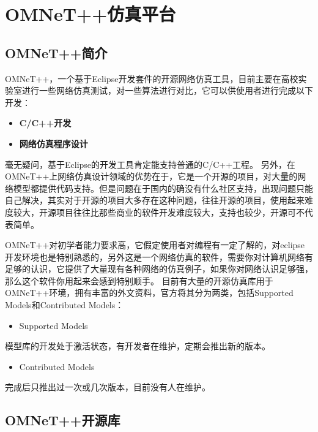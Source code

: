 \chapter{OMNeT++仿真平台}
\label{omnet仿真平台}

\section{OMNeT++简介}
\label{omnet简介}

OMNeT++，一个基于Eclipse开发套件的开源网络仿真工具，目前主要在高校实验室进行一些网络仿真测试，对一些算法进行对比，它可以供使用者进行完成以下开发：

\begin{itemize}
\item \textbf{C\slash C++开发}

\item \textbf{网络仿真程序设计}

\end{itemize}

毫无疑问，基于Eclipse的开发工具肯定能支持普通的C\slash C++工程。
另外，在OMNeT++上网络仿真设计领域的优势在于，它是一个开源的项目，对大量的网络模型都提供代码支持。但是问题在于国内的确没有什么社区支持，出现问题只能自己解决，其实对于开源的项目大多存在这种问题，往往开源的项目，使用起来难度较大，开源项目往往比那些商业的软件开发难度较大，支持也较少，开源可不代表简单。

OMNeT++对初学者能力要求高，它假定使用者对编程有一定了解的，对eclipse开发环境也是特别熟悉的，另外这是一个网络仿真的软件，需要你对计算机网络有足够的认识，它提供了大量现有各种网络的仿真例子，如果你对网络认识足够强，那么这个软件你用起来会感到特别顺手。
目前有大量的开源仿真库用于OMNeT++环境，拥有丰富的外文资料，官方将其分为两类，包括Supported Models和Contributed Models：

\begin{itemize}
\item Supported Models

\end{itemize}

模型库的开发处于激活状态，有开发者在维护，定期会推出新的版本。

\begin{itemize}
\item Contributed Models

\end{itemize}

完成后只推出过一次或几次版本，目前没有人在维护。

\section{OMNeT++开源库}
\label{omnet开源库}

